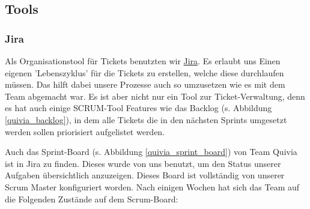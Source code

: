 
\subsection{Tools}
\subsubsection{Jira}
Als Organisationstool für Tickets benutzten wir \href{https://www.atlassian.com/software/jira}{Jira}. Es erlaubt uns Einen eigenen
'Lebenszyklus' für die Tickets zu erstellen, welche diese durchlaufen müssen. Das hilft dabei unsere Prozesse auch so umzusetzen wie
es mit dem Team abgemacht war. Es ist aber nicht nur ein Tool zur Ticket-Verwaltung, denn es hat auch einige SCRUM-Tool Features wie
das Backlog (s. Abbildung \ref{quivia_backlog}), in dem alle Tickets die in den nächsten Sprints umgesetzt werden sollen priorisiert
aufgelistet werden.
\par
Auch das Sprint-Board (s. Abbildung \ref{quivia_sprint_board}) von Team Quivia ist in Jira zu finden. Dieses wurde von uns benutzt, um
den Status unserer Aufgaben übersichtlich anzuzeigen. Dieses Board ist vollständig von unserer Scrum Master konfiguriert worden.
Nach einigen Wochen hat sich das Team auf die Folgenden Zustände auf dem Scrum-Board:
